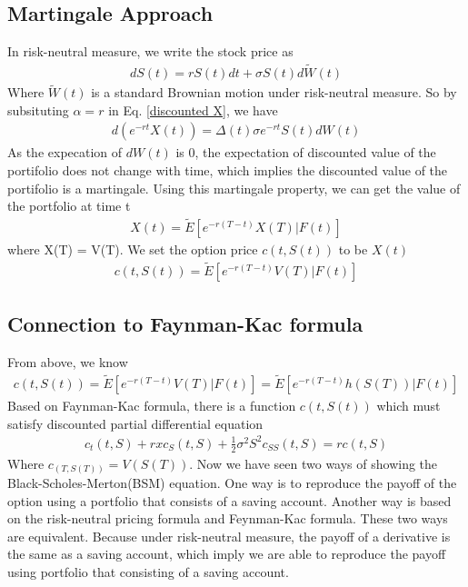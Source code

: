 \documentclass[a4paper]{article}
\begin{document}
\subsection{Martingale Approach}
In risk-neutral measure, we write the stock price as
\begin{align*}
	dS(t) = rS(t) dt + \sigma S(t) d \tilde W(t) 
\end{align*}
Where $\tilde W(t)$ is a standard Brownian motion under risk-neutral measure. So by subsituting $\alpha = r$ in Eq. \ref{discounted X}, we have
\begin{align*}
 d(e^{- r t} X(t)) 
 =  \Delta(t) \sigma e^{-rt} S(t) dW(t)
\end{align*}
As the expecation of $dW(t)$ is 0, the expectation of discounted value of the portifolio does not change with time, which implies the discounted value of the portifolio is a martingale. Using this martingale property, we can get the value of the portfolio at time t 
\begin{align*}
	X(t) = \tilde E[e^{-r(T-t)}X(T)| F(t)]
\end{align*}
where X(T) = V(T).
We set the option price $c(t, S(t))$ to be $X(t)$
\begin{align*}
	c(t, S(t)) = \tilde E[e^{-r(T-t)}V(T)| F(t)]
\end{align*}
\subsection{Connection to Faynman-Kac formula}
From above, we know
\begin{align}
	c(t, S(t)) = \tilde E[e^{-r(T-t)}V(T)| F(t)] = \tilde E[e^{-r(T-t)}h(S(T))| F(t)] \label{rn}
\end{align}
Based on Faynman-Kac formula, there is a function $c(t,S(t))$ which must satisfy discounted partial differential equation 
\begin{align*}
	c_t(t,S) + rx c_S(t,S) + \frac{1}{2} \sigma^2 S^2 c_{SS}(t,S) = rc(t,S)
\end{align*}
Where $c_(T,S(T)) = V(S(T))$.
Now we have seen two ways of showing the Black-Scholes-Merton(BSM) equation. 
One way is to reproduce the payoff of the option using a portfolio that consists of a 
saving account. Another way is based on the risk-neutral pricing formula and Feynman-Kac formula. 
These two ways are equivalent. Because under risk-neutral measure, the payoff of a derivative is the same as a saving account, which imply we are able to reproduce the payoff using portfolio that consisting of a saving account.
\end{document}
